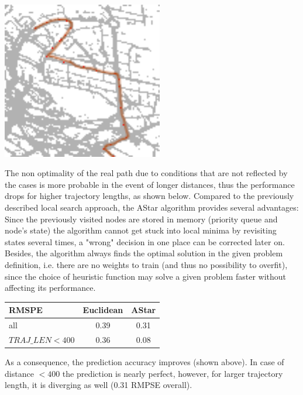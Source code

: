 \documentclass{article}
\newenvironment{Figure}
{\par\medskip\noindent\minipage{\linewidth}}
{\endminipage\par\medskip}
\begin{document}
\begin{multicols}{2}
\begin{Figure}
\begin{center}
\includegraphics[width=7cm]{shortening_true.png}
\end{center}
\label{fig:short_true}
\end{Figure}

The non optimality of the real path due to conditions that are not reflected by the cases is more probable in the event of longer distances, thus the performance drops for higher trajectory lengths, as shown below. Compared to the previously described local search approach, the AStar algorithm provides several advantages: Since the previously visited nodes are stored in memory (priority queue and node's state) the algorithm cannot get stuck into local minima by revisiting states several times, a "wrong" decision in one place can be corrected later on. Besides, the algorithm always finds the optimal solution in the given problem definition, i.e. there are no weights to train (and thus no possibility to overfit), since the choice of heuristic function may solve a given problem faster without affecting its performance. 

\begin{center}
\begin{tabular}{l||c|c}
RMSPE & Euclidean & AStar \\
\hline\hline
all               & 0.39 & 0.31 \\
$TRAJ\_LEN < 400$ & 0.36 & 0.08 \\
\end{tabular}
\end{center}

As a consequence, the prediction accuracy improves (shown above). In case of distance $< 400$ the prediction is nearly perfect, however, for larger trajectory length, it is diverging as well (0.31 RMPSE overall). 


\end{multicols}
\end{document}
